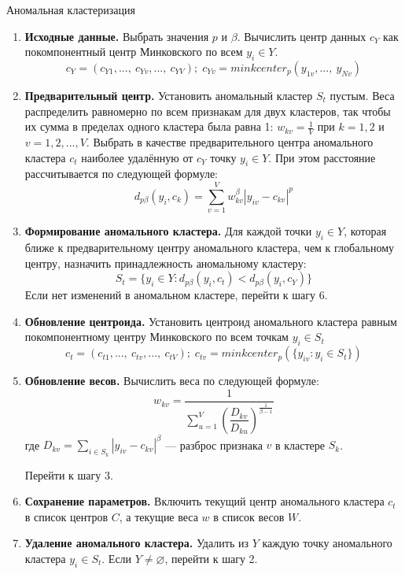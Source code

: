 \documentclass[12pt,twoside,a4paper,tikz,border=5]{refart}
\begin{document}
				\begin{algorithm}{Аномальная кластеризация}{}
					\begin{enumerate}
						\item \textbf{Исходные данные.} Выбрать значения $ p $ и $ \beta $. Вычислить центр данных $ c_Y $ как покомпонентный центр Минковского по всем $ y_i \in Y $.
						\begin{equation}
							c_Y=(c_{Y1},...,\:c_{Yv},...,\:c_{YV});\;c_{Yv}=minkcenter_p(y_{1v},...,\:y_{Nv})
						\end{equation}
						\item \textbf{Предварительный центр.} Установить аномальный кластер $ S_t $ пустым. Веса  распределить равномерно по всем признакам для двух кластеров, так чтобы их сумма в пределах одного кластера была равна 1: $ w_{kv}=\frac{1}{V} $ при $ k=1,2 $ и $ v=1,2,...,V $. Выбрать в качестве предварительного центра аномального кластера $ c_t $ наиболее удалённую от $ c_Y $ точку  $ y_i \in Y $. При этом расстояние рассчитывается по следующей формуле:
						\begin{equation}
							d_{p\beta}(y_i,c_k)=\sum_{v=1}^{V}w^{\beta}_{kv}|y_{iv}-c_{kv}|^{p}
						\end{equation}
						\item \textbf{Формирование аномального кластера.} Для каждой точки $ y_i \in Y $, которая ближе к предварительному центру аномального кластера, чем к глобальному центру, назначить принадлежность аномальному кластеру: 
						\begin{equation}
							S_t=\{y_i \in Y :d_{p\beta}(y_i,c_t) <d_{p\beta}(y_i,c_Y)\} 
						\end{equation}
						Если нет изменений в аномальном кластере, перейти к шагу 6.
						\item \textbf{Обновление центроида.} Установить центроид аномального кластера равным покомпонентному центру Минковского по всем точкам $ y_i \in S_t $
						\begin{equation}
							c_t=(c_{t1},...,\:c_{tv},...,\:c_{tV});\;c_{tv}=minkcenter_p(\{y_{iv}:y_{i} \in S_t\})
						\end{equation}
						\item \textbf{Обновление весов.} Вычислить веса по следующей формуле:
						\begin{equation}\label{eq:update-w}
							w_{kv}=\dfrac{1}{\sum_{u=1}^{V} \left ( \dfrac{D_{kv}}{D_{ku}} \right )^{\frac{1}{\beta-1}}}
						\end{equation}
						\noindent где $D_{kv}=\sum_{i\in S_k}^{}|y_{iv}-c_{kv}|^\beta$ --- разброс признака $ v $ в кластере $ S_k $. 
						
						Перейти к шагу 3.
						\item \textbf{Сохранение параметров.} Включить текущий центр аномального кластера $ c_t $ в список центров $ C $, а текущие веса $ w $ в список весов $ W $.
						\item \textbf{Удаление аномального кластера.} Удалить из $ Y $ каждую точку аномального кластера $ y_i \in S_t $. Если $ Y \neq \varnothing $, перейти к шагу 2.
					\end{enumerate}
				\end{algorithm}	
\end{document}
